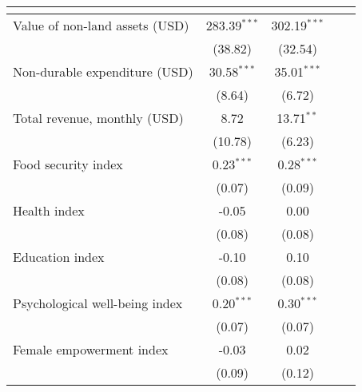 {
\def\sym#1{\ifmmode^{#1}\else\(^{#1}\)\fi}
\begin{tabular}{l*{2}{SS}}
\toprule
          &&\\
\midrule
Value of non-land assets (USD)&283.39$^{***}$&302.19$^{***}$\\
          &  (38.82)&  (32.54)\\
Non-durable expenditure (USD)&30.58$^{***}$&35.01$^{***}$\\
          &   (8.64)&   (6.72)\\
Total revenue, monthly (USD)&     8.72&13.71$^{**}$\\
          &  (10.78)&   (6.23)\\
Food security index&0.23$^{***}$&0.28$^{***}$\\
          &   (0.07)&   (0.09)\\
Health index&    -0.05&     0.00\\
          &   (0.08)&   (0.08)\\
Education index&    -0.10&     0.10\\
          &   (0.08)&   (0.08)\\
Psychological well-being index&0.20$^{***}$&0.30$^{***}$\\
          &   (0.07)&   (0.07)\\
Female empowerment index&    -0.03&     0.02\\
          &   (0.09)&   (0.12)\\
\bottomrule
\end{tabular}
}
